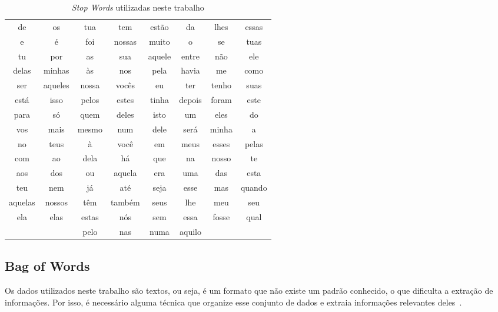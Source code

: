           \begin{table}[h]\label{tb:stopwords}
            \centering
            \begin{tabular}{cccccccc}
            \cline{1-8}
            de & os & tua & tem & estão & da & lhes & essas \\
            e & é & foi & nossas & muito & o & se & tuas \\
            tu & por & as & sua & aquele & entre & não & ele \\
            delas & minhas & às & nos & pela & havia & me & como \\
            ser & aqueles & nossa & vocês & eu & ter & tenho & suas \\
            está & isso & pelos & estes & tinha & depois & foram & este \\
            para & só & quem & deles & isto & um & eles & do \\
            vos & mais & mesmo & num & dele & será & minha & a \\
            no & teus & à & você & em & meus & esses & pelas \\
            com & ao & dela & há & que & na & nosso & te \\
            aos & dos & ou & aquela & era & uma & das & esta \\
            teu & nem & já & até & seja & esse & mas & quando \\
            aquelas & nossos & têm & também & seus & lhe & meu & seu \\
            ela & elas & estas & nós & sem & essa & fosse & qual \\
            & & pelo & nas & numa & aquilo & & \\
            \cline{1-8}
            \end{tabular}
            \caption{\textit{Stop Words} utilizadas neste trabalho}
            \label{exemplos-stop-words}
            \end{table}
            
  

  \subsection{Bag of Words}

            Os dados utilizados neste trabalho são textos, ou seja, é um formato que não existe um padrão conhecido, o que dificulta
            a extração de informações. Por isso, é necessário alguma técnica que organize esse conjunto de dados e extraia informações
            relevantes deles~\cite{wallach2006topic}.

